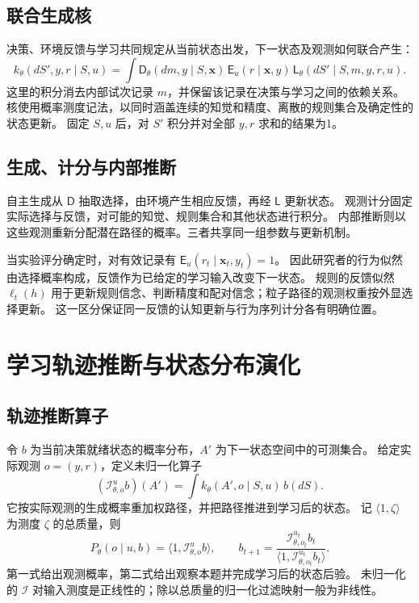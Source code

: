 \documentclass[11pt,a4paper]{article}
\numberwithin{equation}{section}
\newcommand{\Dd}{\mathsf{D}}
\newcommand{\Ll}{\mathsf{L}}
\newcommand{\Ee}{\mathsf{E}}
\newcommand{\Ii}{\mathcal{I}}
\begin{document}
\subsection{联合生成核}
决策、环境反馈与学习共同规定从当前状态出发，下一状态及观测如何联合产生：
\begin{equation}
k_\theta(dS',y,r\mid S,u)=
\int \Dd_\theta(dm,y\mid S,\bm x)\,
\Ee_u(r\mid\bm x,y)\,
\Ll_\theta(dS'\mid S,m,y,r,u).
\label{eq:kernel}
\end{equation}
这里的积分消去内部试次记录 $m$，并保留该记录在决策与学习之间的依赖关系。
核使用概率测度记法，以同时涵盖连续的知觉和精度、离散的规则集合及确定性的状态更新。
固定 $S,u$ 后，对 $S'$ 积分并对全部 $y,r$ 求和的结果为1。

\subsection{生成、计分与内部推断}
自主生成从 $\Dd$ 抽取选择，由环境产生相应反馈，再经 $\Ll$ 更新状态。
观测计分固定实际选择与反馈，对可能的知觉、规则集合和其他状态进行积分。
内部推断则以这些观测重新分配潜在路径的概率。三者共享同一组参数与更新机制。

当实验评分确定时，对有效记录有 $\Ee_u(r_t\mid\bm x_t,y_t)=1$。
因此研究者的行为似然由选择概率构成，反馈作为已给定的学习输入改变下一状态。
规则的反馈似然 $\ell_t(h)$ 用于更新规则信念、判断精度和配对信念；粒子路径的观测权重按外显选择更新。
这一区分保证同一反馈的认知更新与行为序列计分各有明确位置。

\section{学习轨迹推断与状态分布演化}
\label{sec:operators}

\subsection{轨迹推断算子}
令 $b$ 为当前决策就绪状态的概率分布，$A'$ 为下一状态空间中的可测集合。
给定实际观测 $o=(y,r)$，定义未归一化算子
\begin{equation}
(\Ii_{\theta,o}^{u}b)(A')=\int k_\theta(A',o\mid S,u)\,b(dS).
\label{eq:inference}
\end{equation}
它按实际观测的生成概率重加权路径，并把路径推进到学习后的状态。
记 $\langle1,\zeta\rangle$ 为测度 $\zeta$ 的总质量，则
\begin{equation}
P_\theta(o\mid u,b)=\langle1,\Ii_{\theta,o}^{u}b\rangle,\qquad
b_{t+1}=\frac{\Ii_{\theta,o_t}^{u_t}b_t}
{\langle1,\Ii_{\theta,o_t}^{u_t}b_t\rangle}.
\label{eq:filter}
\end{equation}
第一式给出观测概率，第二式给出观察本题并完成学习后的状态后验。
未归一化的 $\Ii$ 对输入测度是正线性的；除以总质量的归一化过滤映射一般为非线性。
\end{document}
